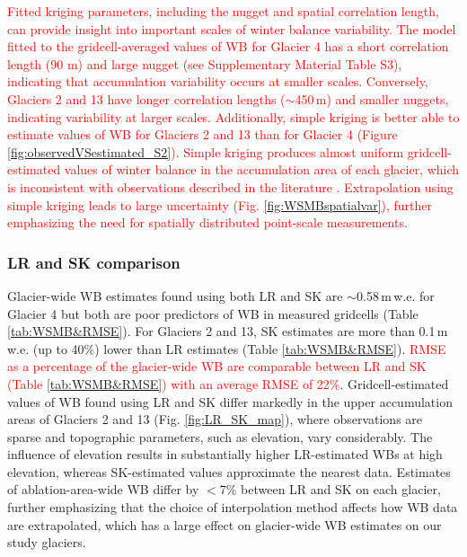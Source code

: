 \documentclass[review,oneside, letterpaper]{igs}
\begin{document}
\textcolor{red}{Fitted kriging parameters, including the nugget and spatial correlation length, can provide insight into important scales of winter balance variability. The model fitted to the gridcell-averaged values of WB for Glacier 4 has a short correlation length (90 m) and large nugget (see Supplementary Material Table S3), indicating that accumulation variability occurs at smaller scales. Conversely, Glaciers 2 and 13 have longer correlation lengths ($\sim$450\,m) and smaller nuggets, indicating variability at larger scales. Additionally, simple kriging is better able to estimate values of WB for Glaciers 2 and 13 than for Glacier 4 (Figure \ref{fig:observedVSestimated_S2}). Simple kriging produces almost uniform gridcell-estimated values of winter balance in the accumulation area of each glacier, which is inconsistent with observations described in the literature \citep[e.g.][]{Machguth2006, Grabiec2011}. Extrapolation using simple kriging leads to large uncertainty (Fig. \ref{fig:WSMBspatialvar}), further emphasizing the need for spatially distributed point-scale measurements. }

\subsubsection{LR and SK comparison}
 
Glacier-wide WB estimates found using both LR and SK are $\sim$0.58\,m\,w.e. for Glacier 4 but both are poor predictors of  WB in measured gridcells (Table \ref{tab:WSMB&RMSE}). For Glaciers 2 and 13, SK estimates are more than 0.1\,m\,w.e. (up to 40\%) lower than LR estimates (Table \ref{tab:WSMB&RMSE}). \textcolor{red}{RMSE as a percentage of the glacier-wide WB are comparable between LR and SK (Table \ref{tab:WSMB&RMSE}) with an average RMSE of 22\%}. Gridcell-estimated values of WB found using LR and SK differ markedly in the upper accumulation areas of Glaciers 2 and 13 (Fig. \ref{fig:LR_SK_map}), where observations are sparse and topographic parameters, such as elevation, vary considerably. The influence of elevation results in substantially higher LR-estimated WBs at high elevation, whereas SK-estimated values approximate the nearest data. Estimates of ablation-area-wide WB differ by $<$7\% between LR and SK on each glacier, further emphasizing that the choice of interpolation method affects how WB data are extrapolated, which has a large effect on glacier-wide WB estimates on our study glaciers. 
\end{document}
